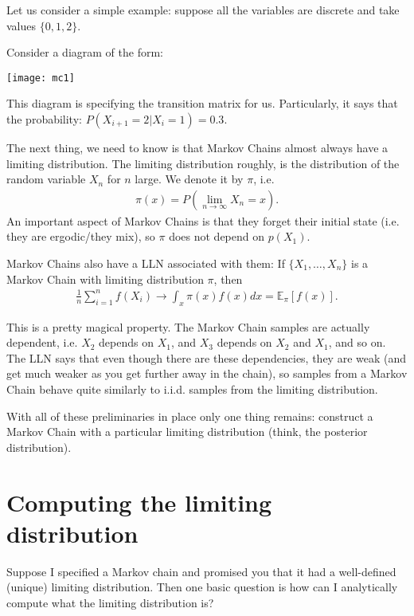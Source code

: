 \documentclass[twoside,12pt]{article}
\begin{document}
Let us consider a simple example: suppose all the variables are discrete and take values $\{0,1,2\}$.

Consider a diagram of the form:

\begin{center}
\texttt{[image: mc1]}
\end{center}

This diagram is specifying the transition matrix for us. Particularly, it says that the probability: $P(X_{i+1} = 2 | X_i = 1) = 0.3$. 

The next thing, we need to know is that Markov Chains almost always have a limiting distribution. The limiting distribution roughly, is the distribution of the random variable $X_n$ for $n$ large. We denote it by $\pi$, i.e.
\begin{align*}
\pi(x) =  P( \lim_{n \rightarrow \infty} X_n = x).
\end{align*}
An important aspect of Markov Chains is that they forget their initial state (i.e. they are ergodic/they mix), so $\pi$ does not depend on $p(X_1)$. 

Markov Chains also have a LLN associated with them: If $\{X_1,\ldots,X_n\}$ is a Markov Chain with limiting distribution $\pi$, then 
\begin{align*}
\frac{1}{n} \sum_{i=1}^n f(X_i) \rightarrow \int_{x} \pi(x) f(x) dx = \mathbb{E}_{\pi} [f(x)]. 
\end{align*}

This is a pretty magical property. The Markov Chain samples are actually dependent, i.e. $X_2$ depends on $X_1$, and $X_3$ depends on $X_2$ and $X_1$, and so on. The LLN says that even though there are these dependencies, they are weak (and get much weaker as you get further away in the chain), so samples from a Markov Chain behave quite similarly to i.i.d. samples from the limiting distribution.

With all of these preliminaries in place only one thing remains: construct a Markov Chain with a particular limiting distribution (think, the posterior distribution).

\section{Computing the limiting distribution}
Suppose I specified a Markov chain and promised you that it had a well-defined (unique) limiting distribution. Then one basic question is how can I analytically compute what the limiting distribution is?
\end{document}
